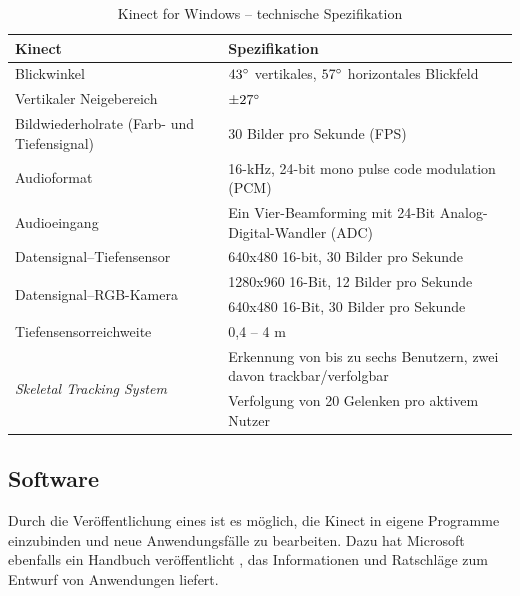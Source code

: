 \begin{table} [H] %
\begin{center}
\caption[Technische Spezifikation der Kinect for Windows]{Kinect for Windows -- technische Spezifikation \footnotemark[8]}
\label{tab:Kinect - technische Spezifikation}
\begin{tabular}{|p{5.7cm}|p{9cm}|}
\hline
\textbf{Kinect} & \textbf{Spezifikation} \\
\hline
Blickwinkel & $43\degree$ vertikales, $57\degree$ horizontales Blickfeld \\
\hline
Vertikaler Neigebereich & $\pm 27\degree$ \\
\hline
Bildwiederholrate (Farb- und Tiefensignal) & 30 Bilder pro Sekunde (FPS) \\
\hline
Audioformat & 16-kHz, 24-bit mono pulse code modulation (PCM)\\
\hline
Audioeingang & Ein Vier-\gls{Beamforming} mit 24-Bit Analog-Digital-Wandler (ADC)\\
\hline
Datensignal--Tiefensensor & 640x480 16-bit, 30 Bilder pro Sekunde \\
\hline
\multirow{2}{*}{Datensignal--RGB-Kamera} & 1280x960 16-Bit, 12 Bilder pro Sekunde\\
& 640x480 16-Bit, 30 Bilder pro Sekunde \\
\hline
Tiefensensorreichweite & 0,4 -- 4 m\\
\hline
\multirow{2}{*}{
\textit{\gls{Skeletal Tracking System}}} & Erkennung von bis zu sechs Benutzern, zwei davon trackbar/verfolgbar\\
& Verfolgung von 20 Gelenken pro aktivem Nutzer\\
\hline
\end{tabular}
\end{center}
\end{table}


\subsection{Software}
Durch die Ver\"offentlichung eines  ist es m\"oglich, die Kinect in eigene Programme einzubinden und neue Anwendungsf\"alle zu bearbeiten.
Dazu hat Microsoft ebenfalls ein Handbuch ver\"offentlicht \cite{bib:kinect_hig}, das Informationen und Ratschl\"age zum Entwurf von Anwendungen liefert.

